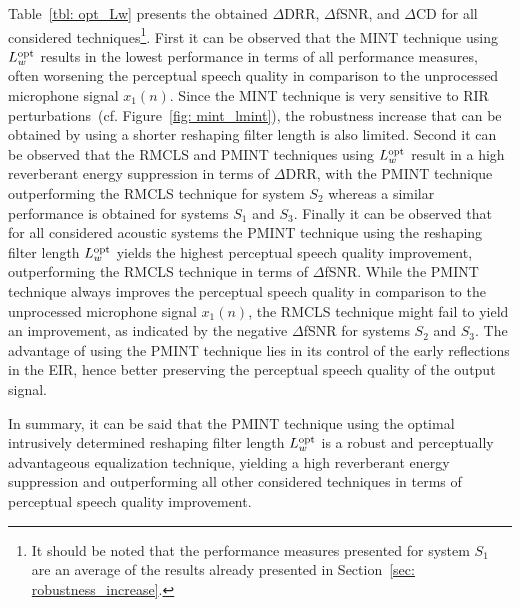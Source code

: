 \documentclass[twocolumn]{bmcart}%
\begin{document}
Table~\ref{tbl: opt_Lw} presents the obtained $\Delta$DRR, $\Delta$fSNR, and $\Delta$CD for all considered techniques\footnote{It should be noted that the performance measures presented for system $S_1$ are an average of the results already presented in Section~\ref{sec: robustness_increase}.}.
First it can be observed that the MINT technique using $L^{\rm opt}_w$ results in the lowest performance in terms of all performance measures, often worsening the perceptual speech quality in comparison to the unprocessed microphone signal $x_1(n)$.
Since the MINT technique is very sensitive to RIR perturbations~(cf. Figure~\ref{fig: mint_lmint}), the robustness increase that can be obtained by using a shorter reshaping filter length is also limited.
Second it can be observed that the RMCLS and PMINT techniques using $L^{\rm opt}_w$ result in a high reverberant energy suppression in terms of $\Delta$DRR, with the PMINT technique outperforming the RMCLS technique for system $S_2$ whereas a similar performance is obtained for systems $S_1$ and $S_3$.
Finally it can be observed that for all considered acoustic systems the PMINT technique using the reshaping filter length $L^{\rm opt}_w$ yields the highest perceptual speech quality improvement, outperforming the RMCLS technique in terms of $\Delta$fSNR.
While the PMINT technique always improves the perceptual speech quality in comparison to the unprocessed microphone signal $x_1(n)$, the RMCLS technique might fail to yield an improvement, as indicated by the negative $\Delta$fSNR for systems $S_2$ and $S_3$.
The advantage of using the PMINT technique lies in its control of the early reflections in the EIR, hence better preserving the perceptual speech quality of the output signal.

In summary, it can be said that the PMINT technique using the optimal intrusively determined reshaping filter length $L^{\rm opt}_w$ is a robust and perceptually advantageous equalization technique, yielding a high reverberant energy suppression and outperforming all other considered techniques in terms of perceptual speech quality improvement.
\end{document}
